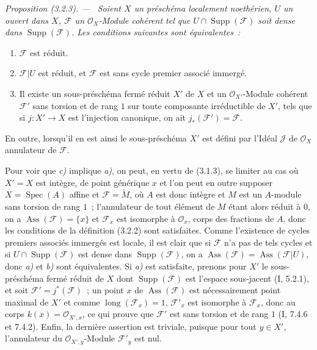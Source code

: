 \documentclass[10pt,oneside]{book}
\newenvironment{proposition}[1][]{%
  \par\medskip\noindent\itshape Proposition (#1). ---\ }{\par}
\begin{document}
\begin{proposition}[3.2.3]
\label{IV.2.3.2.3-fr}
Soient $X$ un préschéma localement noethérien, $U$ un ouvert dans $X$,
$\mathcal F$ un $\mathcal O_X$-Module cohérent tel que
$U\cap\operatorname{Supp}(\mathcal F)$ soit dense dans
$\operatorname{Supp}(\mathcal F)$. Les conditions suivantes sont
équivalentes~:
\begin{enumerate}
\item[\emph{a)}] $\mathcal F$ est réduit.
\item[\emph{b)}] $\mathcal F|U$ est réduit, et $\mathcal F$ est sans cycle
premier associé immergé.
\item[\emph{c)}] Il existe un sous-préschéma fermé réduit $X'$ de $X$ et un
$\mathcal O_{X'}$-Module cohérent $\mathcal F'$ sans torsion et de rang $1$
sur toute composante irréductible de $X'$, tels que si $j:X'\to X$ est
l'injection canonique, on ait $j_*(\mathcal F')=\mathcal F$.
\end{enumerate}
En outre, lorsqu'il en est ainsi le sous-préschéma $X'$ est défini par l'Idéal
$\mathcal J$ de $\mathcal O_X$ annulateur de $\mathcal F$.
\end{proposition}

Pour voir que \emph{c)} implique \emph{a)}, on peut, en vertu de (3.1.3), se
limiter au cas où $X'=X$ est intègre, de point générique $x$ et l'on peut en
outre supposer $X=\operatorname{Spec}(A)$ affine et
$\mathcal F=\widetilde M$, où $A$ est donc intègre et $M$ est un $A$-module
sans torsion de rang $1$~; l'annulateur de tout élément de $M$ étant alors
réduit à $0$, on a $\operatorname{Ass}(\mathcal F)=\{x\}$ et
$\mathcal F_x$ est isomorphe à $\mathcal O_x$, corps des fractions de $A$,
donc les conditions de la définition (3.2.2) sont satisfaites. Comme
l'existence de cycles premiers associés immergés est locale, il est clair que
si $\mathcal F$ n'a pas de tels cycles et si
$U\cap\operatorname{Supp}(\mathcal F)$ est dense dans
$\operatorname{Supp}(\mathcal F)$, on a
$\operatorname{Ass}(\mathcal F)=\operatorname{Ass}(\mathcal F|U)$, donc
\emph{a)} et \emph{b)} sont équivalentes. Si \emph{a)} est satisfaite,
prenons pour $X'$ le sous-préschéma fermé réduit de $X$ dont
$\operatorname{Supp}(\mathcal F)$ est l'espace sous-jacent (I, 5.2.1), et soit
$\mathcal F'=j^*(\mathcal F)$~; un point $x$ de
$\operatorname{Ass}(\mathcal F)$ est nécessairement point maximal de $X'$ et
comme $\operatorname{long}(\mathcal F_x)=1$, $\mathcal F'_x$ est isomorphe à
$\mathcal F_x$, donc au corps $k(x)=\mathcal O_{X',x}$, ce qui prouve que
$\mathcal F'$ est sans torsion et de rang $1$ (I, 7.4.6 et 7.4.2). Enfin, la
dernière assertion est triviale, puisque pour tout $y\in X'$, l'annulateur du
$\mathcal O_{X',y}$-Module $\mathcal F'_y$ est nul.
\end{document}
